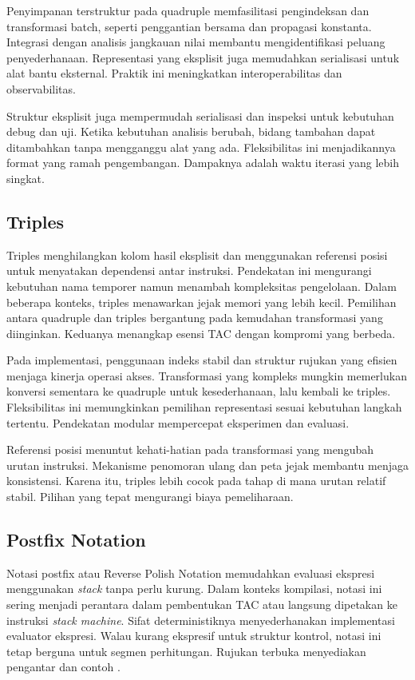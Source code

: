 \documentclass[../main.tex]{subfiles}
\begin{document}
Penyimpanan terstruktur pada quadruple memfasilitasi pengindeksan dan transformasi batch, seperti penggantian bersama dan propagasi konstanta. Integrasi dengan analisis jangkauan nilai membantu mengidentifikasi peluang penyederhanaan. Representasi yang eksplisit juga memudahkan serialisasi untuk alat bantu eksternal. Praktik ini meningkatkan interoperabilitas dan observabilitas.

Struktur eksplisit juga mempermudah serialisasi dan inspeksi untuk kebutuhan debug dan uji. Ketika kebutuhan analisis berubah, bidang tambahan dapat ditambahkan tanpa mengganggu alat yang ada. Fleksibilitas ini menjadikannya format yang ramah pengembangan. Dampaknya adalah waktu iterasi yang lebih singkat.

\subsection{Triples}
Triples menghilangkan kolom hasil eksplisit dan menggunakan referensi posisi untuk menyatakan dependensi antar instruksi. Pendekatan ini mengurangi kebutuhan nama temporer namun menambah kompleksitas pengelolaan. Dalam beberapa konteks, triples menawarkan jejak memori yang lebih kecil. Pemilihan antara quadruple dan triples bergantung pada kemudahan transformasi yang diinginkan. Keduanya menangkap esensi TAC dengan kompromi yang berbeda.

Pada implementasi, penggunaan indeks stabil dan struktur rujukan yang efisien menjaga kinerja operasi akses. Transformasi yang kompleks mungkin memerlukan konversi sementara ke quadruple untuk kesederhanaan, lalu kembali ke triples. Fleksibilitas ini memungkinkan pemilihan representasi sesuai kebutuhan langkah tertentu. Pendekatan modular mempercepat eksperimen dan evaluasi.

Referensi posisi menuntut kehati-hatian pada transformasi yang mengubah urutan instruksi. Mekanisme penomoran ulang dan peta jejak membantu menjaga konsistensi. Karena itu, triples lebih cocok pada tahap di mana urutan relatif stabil. Pilihan yang tepat mengurangi biaya pemeliharaan.

\subsection{Postfix Notation}
Notasi postfix atau Reverse Polish Notation memudahkan evaluasi ekspresi menggunakan \emph{stack} tanpa perlu kurung. Dalam konteks kompilasi, notasi ini sering menjadi perantara dalam pembentukan TAC atau langsung dipetakan ke instruksi \emph{stack machine}. Sifat deterministiknya menyederhanakan implementasi evaluator ekspresi. Walau kurang ekspresif untuk struktur kontrol, notasi ini tetap berguna untuk segmen perhitungan. Rujukan terbuka menyediakan pengantar dan contoh \citep{WikiPostfix}.
\end{document}
